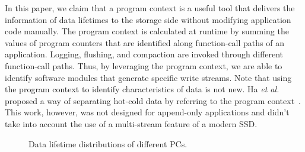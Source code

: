 In this paper, we claim that a program context is a useful tool that delivers
the information of data lifetimes to the storage side without modifying application
code manually. The program context is calculated at runtime by summing the
values of program counters that are identified along function-call paths
of an application.  Logging, flushing, and compaction are invoked through
different function-call paths.  Thus, by leveraging the program context, we are
able to identify software modules that generate specific write streams.  Note
that using the program context to identify characteristics of data is not new.
Ha \textit{et al.} proposed a way of separating hot-cold data by referring to the program
context~\cite{PCHa}. This work, however, was not designed for append-only
applications and didn't take into account the use of a multi-stream feature of
a modern SSD.

\begin{figure}[!t]
\centering
\hspace{1pt}
\hfill
\vspace{-10pt}
\caption{Data lifetime distributions of different PCs.} 
\label{fig:types_and_PCs}
\vspace{-20pt}
\end{figure}

